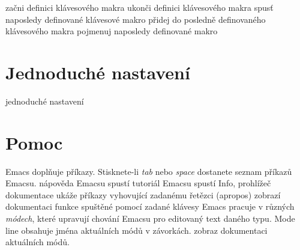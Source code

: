  začni definici klávesového makra
 ukonči definici klávesového makra
 spusť naposledy definované klávesové makro
 přidej do posledně definovaného klávesového makra
 pojmenuj naposledy definované makro

\section{Jednoduché nastavení}

 jednoduché nastavení

\section{Pomoc}

Emacs doplňuje příkazy. Stisknete-li  {\it tab\/} nebo {\it
space\/} dostanete seznam příkazů Emacsu.
\askip
{} nápověda Emacsu
 spustí tutoriál Emacsu
 spustí Info, prohlížeč dokumentace
 ukáže příkazy vyhovující zadanému řetězci (apropos)
 zobrazí dokumentaci funkce spuštěné pomocí zadané klávesy
\askip
Emacs pracuje v různých {\it módech}, které upravují chování
Emacsu pro editovaný text daného typu. Mode line obsahuje jména aktuálních
módů v závorkách.
\askip
{} zobraz dokumentaci aktuálních módů.

\copyrightnotice

\bye

